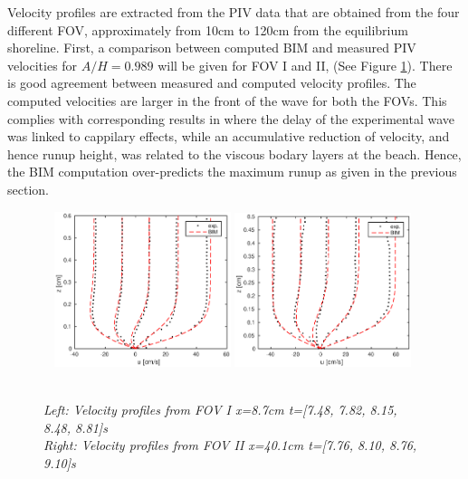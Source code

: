 \documentclass[review]{elsarticle}
\begin{document}
Velocity profiles are extracted from the PIV data that are obtained from the four different FOV, approximately from 10cm to 120cm from the equilibrium shoreline. 
First, a comparison between computed BIM and measured PIV velocities for $A/H=0.989$ will be given for FOV I and II, (See Figure \ref{fig:BIM3_tim}). There is good agreement between measured and computed  velocity profiles. The computed velocities are larger in the front of the wave for both the FOVs. This complies with corresponding results in  \cite{pedersen2013runup} where the
delay of the experimental wave was linked to cappilary effects, while
an accumulative reduction of velocity, and hence runup height, was
related to the viscous bodary layers at the beach.  Hence, the BIM 
computation over-predicts the maximum runup as given in the previous section.

\begin{figure}
        \centering
        ~ %
                \includegraphics[width=0.46\textwidth]{./Figures/BIM/case10_FOV3_PIV_BIM.eps}
                \includegraphics[width=0.46\textwidth]{./Figures/BIM/case10_FOV4_BIM_PIV.eps}
                \caption{\textit{\\ Left: Velocity profiles from FOV I x=8.7cm t=[7.48, 7.82, 8.15, 8.48, 8.81]s\\
                 \quad Right:  Velocity profiles from FOV II x=40.1cm t=[7.76, 8.10, 8.76, 9.10]s}}
              \label{fig:BIM3_tim}
      \end{figure}
\end{document}
